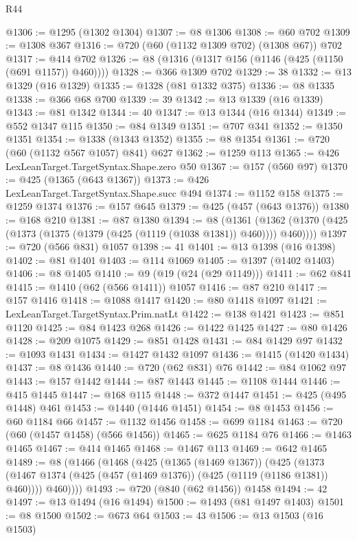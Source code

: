\begin{lexlean}{R44}
\begin{coremodule}
@1306 := @1295 (@1302 @1304)
@1307 := @8 @1306
@1308 := @60 @702
@1309 := @1308 @367
@1316 := @720 (@60 (@1132 @1309 @702) (@1308 @67)) @702
@1317 := @414 @702
@1326 := @8 (@1316 (@1317 @156 (@1146 (@425 (@1150 (@691 @1157)) @460))))
@1328 := @366 @1309 @702
@1329 := 38
@1332 := @13 @1329 (@16 @1329)
@1335 := @1328 (@81 @1332 @375)
@1336 := @8 @1335
@1338 := @366 @68 @700
@1339 := 39
@1342 := @13 @1339 (@16 @1339)
@1343 := @81 @1342
@1344 := 40
@1347 := @13 @1344 (@16 @1344)
@1349 := @552 @1347 @115
@1350 := @84 @1349
@1351 := @707 @341
@1352 := @1350 @1351
@1354 := @1338 (@1343 @1352)
@1355 := @8 @1354
@1361 := @720 (@60 (@1132 @567 @1057) @841) @627
@1362 := @1259 @113
@1365 := @426 LexLeanTarget.TargetSyntax.Shape.zero @50
@1367 := @157 (@560 @97)
@1370 := @425 (@1365 (@643 @1367))
@1373 := @426 LexLeanTarget.TargetSyntax.Shape.succ @494
@1374 := @1152 @158
@1375 := @1259 @1374
@1376 := @157 @645
@1379 := @425 (@457 (@643 @1376))
@1380 := @168 @210
@1381 := @87 @1380
@1394 := @8
    (@1361 (@1362 (@1370 (@425 (@1373 (@1375 (@1379 (@425 (@1119 (@1038 @1381)) @460)))) @460))))
@1397 := @720 (@566 @831) @1057
@1398 := 41
@1401 := @13 @1398 (@16 @1398)
@1402 := @81 @1401
@1403 := @114 @1069
@1405 := @1397 (@1402 @1403)
@1406 := @8 @1405
@1410 := @9 (@19 (@24 (@29 @1149)))
@1411 := @62 @841
@1415 := @1410 (@62 (@566 @1411)) @1057
@1416 := @87 @210
@1417 := @157 @1416
@1418 := @1088 @1417
@1420 := @80 @1418 @1097
@1421 := LexLeanTarget.TargetSyntax.Prim.natLt
@1422 := @138 @1421
@1423 := @851 @1120
@1425 := @84 @1423 @268
@1426 := @1422 @1425
@1427 := @80 @1426
@1428 := @209 @1075
@1429 := @851 @1428
@1431 := @84 @1429 @97
@1432 := @1093 @1431
@1434 := @1427 @1432 @1097
@1436 := @1415 (@1420 @1434)
@1437 := @8 @1436
@1440 := @720 (@62 @831) @76
@1442 := @84 @1062 @97
@1443 := @157 @1442
@1444 := @87 @1443
@1445 := @1108 @1444
@1446 := @415 @1445
@1447 := @168 @115
@1448 := @372 @1447
@1451 := @425 (@495 @1448) @461
@1453 := @1440 (@1446 @1451)
@1454 := @8 @1453
@1456 := @60 @1184 @66
@1457 := @1132 @1456
@1458 := @699 @1184
@1463 := @720 (@60 (@1457 @1458) (@566 @1456))
@1465 := @625 @1184 @76
@1466 := @1463 @1465
@1467 := @414 @1465
@1468 := @1467 @113
@1469 := @642 @1465
@1489 := @8
    (@1466
      (@1468
        (@425
          (@1365 (@1469 @1367))
          (@425
            (@1373 (@1467 @1374 (@425 (@457 (@1469 @1376)) (@425 (@1119 (@1186 @1381)) @460))))
            @460))))
@1493 := @720 (@840 (@62 @1456)) @1458
@1494 := 42
@1497 := @13 @1494 (@16 @1494)
@1500 := @1493 (@81 @1497 @1403)
@1501 := @8 @1500
@1502 := @673 @64
@1503 := 43
@1506 := @13 @1503 (@16 @1503)

\end{coremodule}
\end{lexlean}

